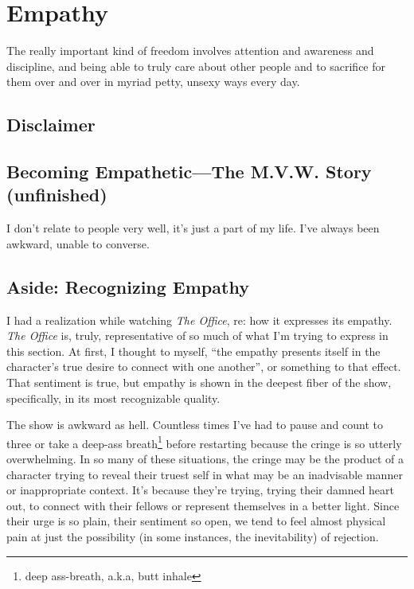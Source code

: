 \documentclass[../philo.tex]{subfiles}
\begin{document}
\chapter{Empathy}
\epigraph{The really important kind of freedom involves attention and awareness and discipline, and being able to truly care about other people and to sacrifice for them over and over in myriad petty, unsexy ways every day.}{}
\newpage

\section*{Disclaimer}


\section{Becoming Empathetic---The M.V.W. Story (unfinished)}
I don't relate to people very well, it's just a part of my life.
I've always been awkward, unable to converse.

\section*{Aside: Recognizing Empathy}
I had a realization while watching \textit{The Office}, re: how it expresses its empathy.
\textit{The Office} is, truly, representative of so much of what I'm trying to express in this section.
At first, I thought to myself, ``the empathy presents itself in the character's true desire to connect with one another'', or something to that effect.
That sentiment is true, but empathy is shown in the deepest fiber of the show, specifically, in its most recognizable quality.

The show is awkward as hell.
Countless times I've had to pause and count to three or take a deep-ass breath\footnote{deep ass-breath, a.k.a, butt inhale} before restarting because the cringe is so utterly overwhelming.
In so many of these situations, the cringe may be the product of a character trying to reveal their truest self in what may be an inadvisable manner or inappropriate context.
It's because they're trying, trying their damned heart out, to connect with their fellows or represent themselves in a better light.
Since their urge is so plain, their sentiment so open, we tend to feel almost physical pain at just the possibility (in some instances, the inevitability) of rejection.
\end{document}
